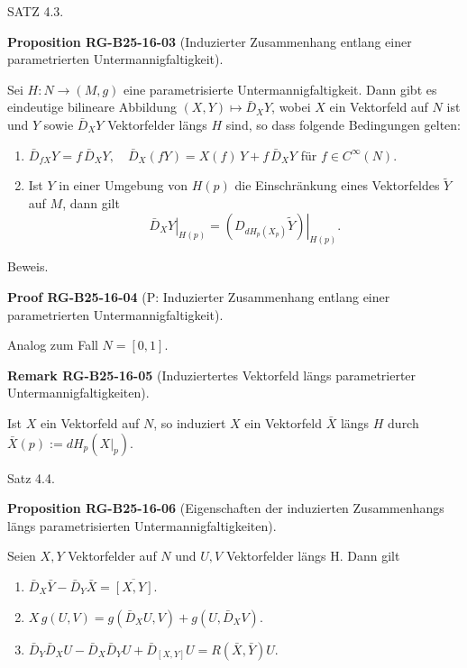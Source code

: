 \documentclass[10pt, letterpaper]{article}
\newcommand{\CustomHeading}[3]{%
  \par\medskip\noindent%
  \textbf{#1 #2} \textnormal{(#3)}.\enskip%
}
\newenvironment{PROP}[2]{\begin{unitbox}\CustomHeading{Proposition}{#1}{#2}}{\end{unitbox}}
\newenvironment{REM}[2]{\begin{unitbox}\CustomHeading{Remark}{#1}{#2}}{\end{unitbox}}
\newenvironment{PROOF}[2]{\begin{unitbox}\CustomHeading{Proof}{#1}{#2}}{\end{unitbox}}
\begin{document}
SATZ 4.3. 

\begin{PROP}{RG-B25-16-03}{Induzierter Zusammenhang entlang einer parametrierten Untermannigfaltigkeit}
Sei $H: N \rightarrow(M, g)$ eine parametrisierte Untermannigfaltigkeit. Dann gibt es eindeutige bilineare Abbildung $(X, Y) \mapsto \bar{D}_{X} Y$, wobei $X$ ein Vektorfeld auf $N$ ist und $Y$ sowie $\bar{D}_{X} Y$ Vektorfelder längs $H$ sind, so dass folgende Bedingungen gelten:
\begin{enumerate}
  \item $\bar{D}_{f X} Y = f\, \bar{D}_{X} Y,\quad \bar{D}_{X}(f Y) = X(f)\, Y + f\, \bar{D}_{X} Y$ \quad für $f \in C^{\infty}(N)$.
  
  \item Ist $Y$ in einer Umgebung von $H(p)$ die Einschränkung eines Vektorfeldes $\tilde{Y}$ auf $M$, dann gilt
  \[
  \left.\bar{D}_{X} Y\right|_{H(p)} = \left. \left(D_{d H_{p}(X_{p})} \tilde{Y} \right) \right|_{H(p)}.
  \]
\end{enumerate}
\end{PROP}



Beweis. 

\begin{PROOF}{RG-B25-16-04}{P: Induzierter Zusammenhang entlang einer parametrierten Untermannigfaltigkeit}
Analog zum Fall $N=[0,1]$.
\end{PROOF}



\begin{REM}{RG-B25-16-05}{Induziertertes Vektorfeld längs parametrierter Untermannigfaltigkeiten}
Ist $X$ ein Vektorfeld auf $N$, so induziert $X$ ein Vektorfeld $\bar{X}$ längs $H$ durch $\bar{X}(p):=d H_{p}\left(\left.X\right|_{p}\right)$.
\end{REM}



Satz 4.4. 

\begin{PROP}{RG-B25-16-06}{Eigenschaften der induzierten Zusammenhangs längs parametrisierten Untermannigfaltigkeiten}
Seien $X, Y$ Vektorfelder auf $N$ und $U, V$ Vektorfelder längs H. Dann gilt
\begin{enumerate}
  \item $\bar{D}_{X} \bar{Y} - \bar{D}_{Y} \bar{X} = \overline{[X, Y]}$.
  
  \item $X\, g(U, V) = g\left( \bar{D}_{X} U, V \right) + g\left( U, \bar{D}_{X} V \right)$.

  \item $\bar{D}_{Y} \bar{D}_{X} U - \bar{D}_{X} \bar{D}_{Y} U + \bar{D}_{[X, Y]} U = R(\bar{X}, \bar{Y}) U$.
\end{enumerate}
\end{PROP}
\end{document}
